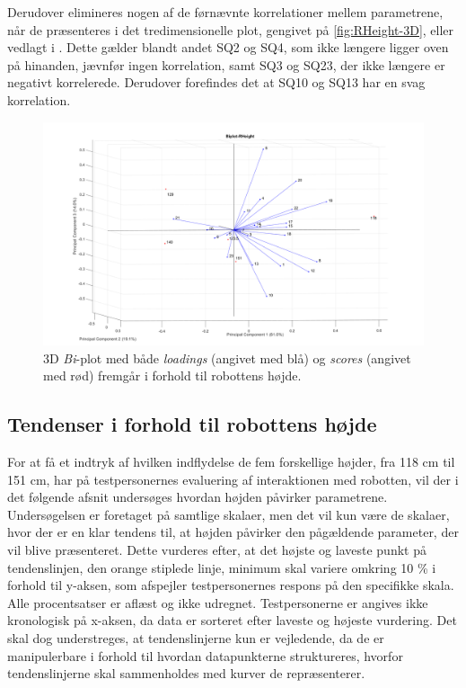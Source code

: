Derudover elimineres nogen af de førnævnte korrelationer mellem parametrene, når de præsenteres i det tredimensionelle plot, gengivet på \autoref{fig:RHeight-3D}, eller vedlagt i . Dette gælder blandt andet SQ2 og SQ4, som ikke længere ligger oven på hinanden, jævnfør ingen korrelation, samt SQ3 og SQ23, der ikke længere er negativt korrelerede. Derudover forefindes det at SQ10 og SQ13 har en svag korrelation.   
\begin{figure}[H]
\centering
\includegraphics[width=\textwidth]{Figure/DatabehandlingSkalaer/PCAfigures/RHeight-3D.png}
\caption{3D \textit{Bi}-plot med både \textit{loadings} (angivet med blå) og \textit{scores} (angivet med rød) fremgår i forhold til robottens højde.}
\label{fig:RHeight-3D}
\end{figure}
%

\subsection{Tendenser i forhold til robottens højde}
\label{DatabehandlingRHeightTendenser}
%
For at få et indtryk af hvilken indflydelse de fem forskellige højder, fra 118 cm til 151 cm, har på testpersonernes evaluering af interaktionen med robotten, vil der i det følgende afsnit undersøges hvordan højden påvirker parametrene. Undersøgelsen er foretaget på samtlige skalaer, men det vil kun være de skalaer, hvor der er en klar tendens til, at højden påvirker den pågældende parameter, der vil blive præsenteret. Dette vurderes efter, at det højste og laveste punkt på tendenslinjen, den orange stiplede linje, minimum skal variere omkring 10 \% i forhold til y-aksen, som afspejler testpersonernes respons på den specifikke skala. Alle procentsatser er aflæst og ikke udregnet. Testpersonerne er angives ikke kronologisk på x-aksen, da data er sorteret efter laveste og højeste vurdering. Det skal dog understreges, at tendenslinjerne kun er vejledende, da de er manipulerbare i forhold til hvordan datapunkterne struktureres, hvorfor tendenslinjerne skal sammenholdes med kurver de repræsenterer. 

